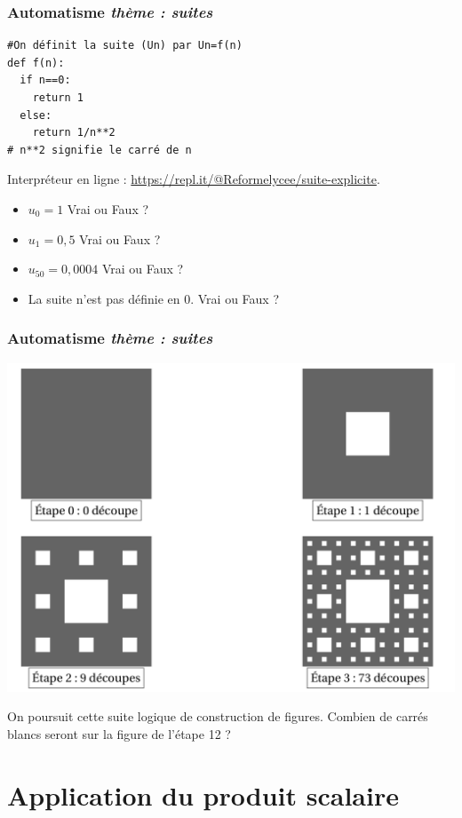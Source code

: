 \documentclass[11pt]{beamer}
\newcounter{autocompteur}
\newcommand{\automatisme}[1]{\addtocounter{autocompteur}{1}\frametitle{Automatisme  \theautocompteur  \textit{ thème : #1}}}
\begin{document}
\begin{frame}[fragile]
\automatisme{suites}
\begin{lstlisting}
#On définit la suite (Un) par Un=f(n)
def f(n):
  if n==0:
    return 1
  else:
    return 1/n**2  
# n**2 signifie le carré de n
\end{lstlisting}

Interpr\'eteur en ligne : \url{https://repl.it/@Reformelycee/suite-explicite}.

\begin{itemize}
	\item $u_{0}=1$ Vrai ou Faux ?
	\item $u_{1}=0,5$ Vrai ou Faux ?
	\item $u_{50}=0,0004$ Vrai ou Faux ?
	\item La suite n'est pas d\'efinie en $0$. Vrai ou Faux ?
\end{itemize}
\end{frame}


\begin{frame}
\automatisme{suites}

\begin{center}
\includegraphics[scale=0.15]{ressources/sierpinski.png}
\end{center}

On poursuit cette suite logique de construction de figures. Combien de carrés blancs seront sur la figure de l'étape 12 ?
\end{frame}



\section{Application du produit scalaire}
\end{document}
